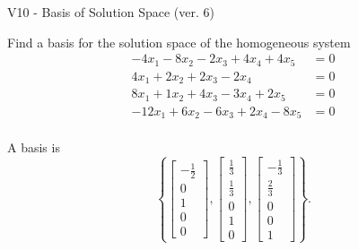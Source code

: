 \begin{exercise}
  \begin{exerciseTitle}V10 - Basis of Solution Space (ver. 6)\end{exerciseTitle}
  \begin{exerciseStatement}
    Find a basis for the solution space of the homogeneous system 
\begin{align*}
 -4 x_ 1 -8 x_ 2 -2 x_ 3 + 4 x_ 4 + 4 x_ 5 &= 0  \\ 
  4 x_ 1 + 2 x_ 2 + 2 x_ 3 -2 x_ 4 &= 0  \\ 
  8 x_ 1 + 1 x_ 2 + 4 x_ 3 -3 x_ 4 + 2 x_ 5 &= 0  \\ 
  -12 x_ 1 + 6 x_ 2 -6 x_ 3 + 2 x_ 4 -8 x_ 5 &= 0  \\ 
 \end{align*}


 
  \end{exerciseStatement}

  \begin{exerciseAnswer}
   A basis is   
\[\left\{\left[\begin{array}{c}
-\frac{1}{2} \\
0 \\
1 \\
0 \\
0
\end{array}\right] , \left[\begin{array}{c}
\frac{1}{3} \\
\frac{1}{3} \\
0 \\
1 \\
0
\end{array}\right] , \left[\begin{array}{c}
-\frac{1}{3} \\
\frac{2}{3} \\
0 \\
0 \\
1
\end{array}\right]\right\}.\]

  


  \end{exerciseAnswer}
\end{exercise}